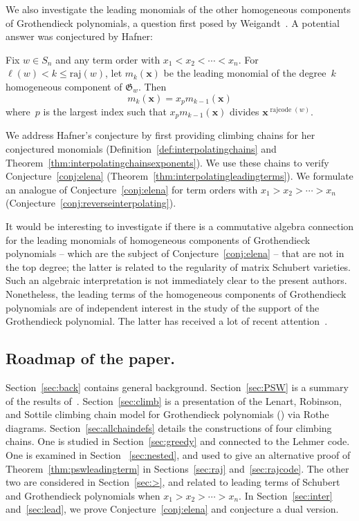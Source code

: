 \documentclass[ALCO]{cedram}
\newcommand{\absrajcode}[1]{\mathrm{raj}(#1)}
\DeclareMathOperator{\rr}{\mathrm{rajcode}}
\begin{document}
We also investigate the leading monomials of the other homogeneous components of Grothendieck polynomials, a question first posed by Weigandt~\cite{annacascade}. A potential answer was conjectured by Hafner:	
\begin{conjecture}
	\label{conj:elena}
	Fix $w\in S_n$ and any term order with $x_1<x_2<\cdots<x_n$. For $\ell(w)< k\leq \absrajcode{w}$, let $m_k(\bm{x})$ be the leading monomial of the degree~$k$ homogeneous component of $\mathfrak{G}_w$. Then
	\[m_k(\bm{x}) = x_pm_{k-1}(\bm{x}) \]
	where~$p$ is the largest index such that $x_p m_{k-1}(\bm{x})$ divides $\bm{x}^{\rr(w)}$.
\end{conjecture}

We address Hafner's conjecture by first providing climbing chains for her conjectured monomials (Definition~\ref{def:interpolatingchains} and Theorem~\ref{thm:interpolatingchainsexponents}). We use these chains to verify Conjecture~\ref{conj:elena} (Theorem~\ref{thm:interpolatingleadingterms}). We formulate an analogue of Conjecture~\ref{conj:elena} for term orders with $x_1>x_2>\cdots>x_n$ (Conjecture~\ref{conj:reverseinterpolating}). 

It would be interesting to investigate if there is a  commutative algebra connection for the leading monomials of homogeneous components of Grothendieck polynomials -- which are the subject of Conjecture~\ref{conj:elena} -- that are not in the top degree; the latter is related to the regularity of matrix Schubert varieties. Such an algebraic interpretation is not immediately clear to the present authors. Nonetheless, the leading terms of the homogeneous components of Grothendieck polynomials are  of independent interest in the study of the support  of the Grothendieck polynomial. The latter has received a lot of recent attention~\cite{schlorentzian, support, elena1, proof1, proof2}.

\subsection*{Roadmap of the paper.}
Section~\ref{sec:back} contains general background.
Section~\ref{sec:PSW} is a summary of the results of~\cite{PSW}.
Section~\ref{sec:climb} is a presentation of the Lenart, Robinson, and Sottile climbing chain model for Grothendieck polynomials (\cite{LRS}) via Rothe diagrams. Section~\ref{sec:allchaindefs} details the constructions of four climbing chains. One is studied in Section~\ref{sec:greedy} and connected to the Lehmer code. One is examined in Section ~\ref{sec:nested}, and used to give an alternative proof of Theorem~\ref{thm:pswleadingterm} in Sections~\ref{sec:raj} and~\ref{sec:rajcode}. The other two are considered in Section~\ref{sec:>}, and related to leading terms of Schubert and Grothendieck polynomials when $x_1>x_2>\cdots>x_n$. In Section~\ref{sec:inter} and~\ref{sec:lead}, we prove Conjecture~\ref{conj:elena} and conjecture a dual version.
\end{document}
